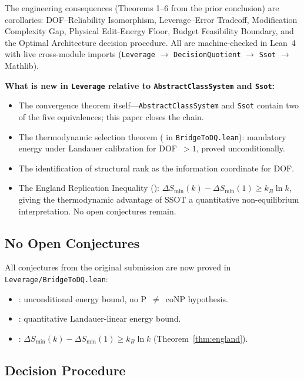 The engineering consequences (Theorems 1--6 from the prior conclusion) are corollaries: DOF--Reliability Isomorphism, Leverage--Error Tradeoff, Modification Complexity Gap, Physical Edit-Energy Floor, Budget Feasibility Boundary, and the Optimal Architecture decision procedure. All are machine-checked in Lean~4 with live cross-module imports (\nolinkurl{Leverage} $\to$ \nolinkurl{DecisionQuotient} $\to$ \nolinkurl{Ssot} $\to$ Mathlib).

\textbf{What is new in \nolinkurl{Leverage} relative to \nolinkurl{AbstractClassSystem} and \nolinkurl{Ssot}:}
\begin{itemize}
\item The convergence theorem itself---\nolinkurl{AbstractClassSystem} and \nolinkurl{Ssot} contain two of the five equivalences; this paper closes the chain.
\item The thermodynamic selection theorem ( in \nolinkurl{BridgeToDQ.lean}): mandatory energy under Landauer calibration for DOF~$> 1$, proved unconditionally.
\item The identification of structural rank as the information coordinate for DOF.
\item The England Replication Inequality (): $\Delta S_{\min}(k) - \Delta S_{\min}(1) \geq k_B \ln k$, giving the thermodynamic advantage of SSOT a quantitative non-equilibrium interpretation. No open conjectures remain.
\end{itemize}

\subsection{No Open Conjectures}

All conjectures from the original submission are now proved in \nolinkurl{Leverage/BridgeToDQ.lean}:
\begin{itemize}
\item {}: unconditional energy bound, no P~$\neq$~coNP hypothesis.
\item {}: quantitative Landauer-linear energy bound.
\item {}: $\Delta S_{\min}(k) - \Delta S_{\min}(1) \geq k_B \ln k$ (Theorem~\ref{thm:england}).
\end{itemize}

\subsection{Decision Procedure}


